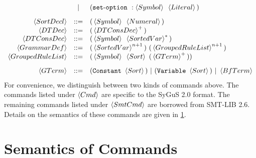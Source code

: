 \documentclass[english,a4paper,10pt]{article}
\begin{document}
\[\begin{array}{rcl}
 & | & \paren{\setoptkwd\mbox{ }:\symbol\mbox{ }\literal} \\[2ex]
 \sortdecl & ::= & \paren{\symbol\mbox{ }\intconst}\\
 \dtdec & ::= & \paren{\kplus{\dtconsdec}} \\
 \dtconsdec & ::= & \paren{\symbol\mbox{ }\kstar{\sortedvar}} \\
 \grammardef & ::= & \paren{\kstarn{\sortedvar}{n+1}}\mbox{ }\paren{\kstarn{\ntdef}{n+1}} \\
 \ntdef & ::= & \paren{\symbol\mbox{ }\sortexpr\mbox{ }\paren{ \kplus{\gterm} } } \\[2ex]
 \gterm 
 & ::= &  \paren{\constantkwd\mbox{ }\sortexpr}\mbox{ }|\mbox{ }\paren{\varkwd\mbox{ }\sortexpr}\mbox{ }|\mbox{ }\bfterm\\
\end{array}
\]
For convenience,
we distinguish between two kinds of commands above.
The commands listed under $\cmd$ are specific to the SyGuS 2.0 format.
The remaining commands listed under $\smtcmd$
are borrowed from SMT-LIB 2.6.
Details on the semantics of these commands are given in \cref{sec:semantics}.


\section{Semantics of Commands}
\label{sec:semantics}
\end{document}
